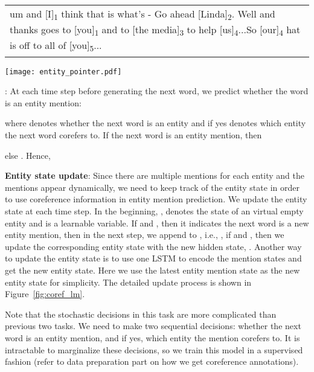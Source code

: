 \documentclass[11pt,letterpaper]{article}
\begin{document}
\begin{figure*}[tbh]
  \centering
  \begin{minipage}[b]{0.7\textwidth}
    \centering
    \begin{tabular}{p{12cm}}
      um and [I]\textsubscript{1} think that is what’s - Go ahead
      [Linda]\textsubscript{2}. Well and thanks goes to [you]\textsubscript{1} and to
      [the media]\textsubscript{3} to help [us]\textsubscript{4}...So
      [our]\textsubscript{4} hat is off to all of [you]\textsubscript{5}...
    \end{tabular}
  \end{minipage}
  \centering
  \begin{minipage}[b]{0.7\textwidth}
    \centering
    \texttt{[image: entity\_pointer.pdf]}
  \end{minipage}
  \caption{Coreference based language model, example taken from \citet{wiseman2016learning}.}
  \label{fig:coref_lm}
  \vspace{-0.3cm}
\end{figure*}
: At each time step before generating the next
word, we predict whether the word is an entity mention:

where  denotes whether the next word is an entity and if yes 
denotes which entity the next word corefers to.  If the next word is an entity
mention, then

else . Hence,

{\bf Entity state update}: Since there are multiple mentions for each entity
and the mentions appear dynamically, we need to keep track of the entity state
in order to use coreference information in entity mention prediction. We update the entity state  at each
time step. In the beginning, ,  denotes the
state of an virtual empty entity and is a learnable variable.
If  and , then
it indicates the next word is a new entity mention, then in the next step,  we
append  to , i.e., , if  and , then we update the corresponding entity state with the new hidden state,
. Another way to update the entity state is to use
one LSTM to encode the mention states and get the new entity state. Here we use the latest entity
mention state as the new entity state for simplicity.
The detailed update process is shown in Figure~\ref{fig:coref_lm}.

Note that the stochastic decisions in this task are more complicated than
previous two tasks. We need to make two sequential decisions: whether the next
word is an entity mention, and if yes, which entity the mention corefers to. It
is intractable to marginalize these decisions, so we train this model in a
supervised fashion (refer to data preparation part on how we get coreference
annotations).
\end{document}
